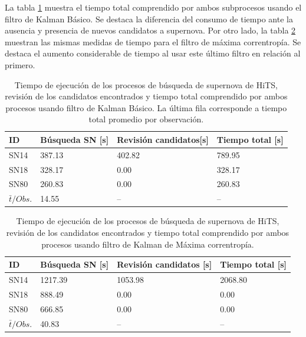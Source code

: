 La tabla \ref{tab:t5} muestra el tiempo total comprendido por ambos subprocesos usando el filtro de Kalman B\'asico. Se destaca la diferencia del consumo de tiempo ante la ausencia y presencia de nuevos candidatos a supernova. Por otro lado, la tabla \ref{tab:t6} muestran las mismas medidas de tiempo para el filtro de m\'axima correntrop\'ia. Se destaca el aumento considerable de tiempo al usar este \'ultimo filtro en relaci\'on al primero. 
  
\begin{table}[h!]
\centering
\caption{Tiempo de ejecuci\'on de los procesos de b\'usqueda de supernova de HiTS, revisi\'on de los candidatos encontrados y tiempo total comprendido por ambos procesos usando filtro de Kalman B\'asico. La \'ultima fila corresponde a tiempo total promedio por observaci\'on.}
\begin{tabular}{|l|l|l|l|}
\hline
\textbf{ID} & \textbf{B\'usqueda SN [s]} & \textbf{Revisi\'on candidatos[s]} & \textbf{Tiempo total [s]} \\ \hline
\hline
SN14 & 387.13 & 402.82 & 789.95 \\\hline
SN18 & 328.17 & 0.00 & 328.17\\\hline
SN80 & 260.83 & 0.00 & 260.83 \\\hline\hline
 $\bar{t}/Obs. $& 14.55 & -- & --\\\hline 
\end{tabular}
\label{tab:t5}
\end{table}


\begin{table}[h!]
\centering
\caption{Tiempo de ejecuci\'on de los procesos de b\'usqueda de supernova de HiTS, revisi\'on de los candidatos encontrados y tiempo total comprendido por ambos procesos usando filtro de Kalman de M\'axima correntrop\'ia.}
\begin{tabular}{|l|l|l|l|}
\hline
\textbf{ID} & \textbf{B\'usqueda SN [s]} & \textbf{Revisi\'on candidatos [s]} & \textbf{Tiempo total [s]} \\ \hline
\hline
SN14 & 1217.39 & 1053.98 & 2068.80\\\hline
SN18 & 888.49 & 0.00 & 0.00\\\hline
SN80 & 666.85 & 0.00& 0.00\\\hline \hline
 $\bar{t}/Obs. $& 40.83 & -- & --\\\hline 
\end{tabular}
\label{tab:t6}
\end{table}

